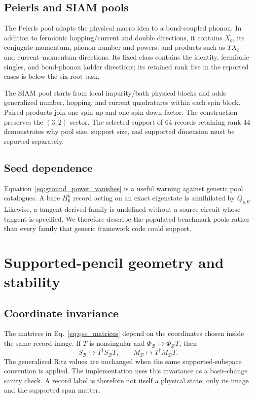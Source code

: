\documentclass[
  reprint,
  amsmath,
  amssymb,
  aps,
  pra,
  nofootinbib,
  superscriptaddress,
  floatfix
]{revtex4-2}
\begin{document}
\subsection{Peierls and SIAM pools}

The Peierls pool adapts the physical macro idea to a bond-coupled phonon.  In
addition to fermionic hopping/current and double directions, it contains
$X_b$, its conjugate momentum, phonon number and powers, and products such as
$TX_b$ and current--momentum directions.  Its fixed class contains the
identity, fermionic singles, and bond-phonon ladder directions; its retained
rank five in the reported cases is below the six-root task.

The SIAM pool starts from local impurity/bath physical blocks and adds
generalized number, hopping, and current quadratures within each spin block.
Paired products join one spin-up and one spin-down factor.  The construction
preserves the $(3,2)$ sector.  The selected support of 64 records retaining
rank 44 demonstrates why pool size, support size, and supported dimension
must be reported separately.

\subsection{Seed dependence}

Equation~\eqref{eq:ground_power_vanishes} is a useful warning against generic
pool catalogues.  A bare $H_0^k$ record acting on an exact eigenstate is
annihilated by $Q_{\mathfrak s,0}$.  Likewise, a tangent-derived family is
undefined without a source circuit whose tangent is specified.  We therefore
describe the populated benchmark pools rather than every family that generic
framework code could support.

\section{Supported-pencil geometry and stability}
\label{app:supported_solve}

\subsection{Coordinate invariance}

The matrices in Eq.~\eqref{eq:qse_matrices} depend on the coordinates chosen
inside the same record image.  If $T$ is nonsingular and
$\Phi_{\mathcal B}\mapsto\Phi_{\mathcal B}T$, then
\begin{equation}
 S_{\mathcal B}\mapsto T^\dagger S_{\mathcal B}T,
 \qquad
 M_{\mathcal B}\mapsto T^\dagger M_{\mathcal B}T.
 \label{eq:pencil_congruence}
\end{equation}
The generalized Ritz values are unchanged when the same supported-subspace
convention is applied.  The implementation uses this invariance as a
basis-change sanity check.  A record label is therefore not itself a physical
state; only its image and the supported span matter.
\end{document}
